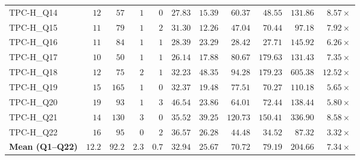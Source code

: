 \begin{table}[htbp]
\begin{tabular}{@{}lrrrrrrrrrr@{}}
TPC-H\_Q14 & $12$ & $57$ & $1$ & $0$ & $27.83$ & $15.39$ & $60.37$ & $48.55$ & $131.86$ & $8.57\times$ \\
TPC-H\_Q15 & $11$ & $79$ & $1$ & $2$ & $31.30$ & $12.26$ & $47.04$ & $70.44$ & $97.18$ & $7.92\times$ \\
TPC-H\_Q16 & $11$ & $84$ & $1$ & $1$ & $28.39$ & $23.29$ & $28.42$ & $27.71$ & $145.92$ & $6.26\times$ \\
TPC-H\_Q17 & $10$ & $50$ & $1$ & $1$ & $26.14$ & $17.88$ & $80.67$ & $179.63$ & $131.43$ & $7.35\times$ \\
TPC-H\_Q18 & $12$ & $75$ & $2$ & $1$ & $32.23$ & $48.35$ & $94.28$ & $179.23$ & $605.38$ & $12.52\times$ \\
TPC-H\_Q19 & $15$ & $165$ & $1$ & $0$ & $32.37$ & $19.48$ & $77.51$ & $70.27$ & $110.18$ & $5.65\times$ \\
TPC-H\_Q20 & $19$ & $93$ & $1$ & $3$ & $46.54$ & $23.86$ & $64.01$ & $72.44$ & $138.44$ & $5.80\times$ \\
TPC-H\_Q21 & $14$ & $130$ & $3$ & $0$ & $35.52$ & $39.25$ & $120.73$ & $150.41$ & $336.90$ & $8.58\times$ \\
TPC-H\_Q22 & $16$ & $95$ & $0$ & $2$ & $36.57$ & $26.28$ & $44.48$ & $34.52$ & $87.32$ & $3.32\times$ \\
\midrule
\textbf{Mean (Q1--Q22)} & $12.2$ & $92.2$ & $2.3$ & $0.7$ & $32.94$ & $25.67$ & $70.72$ & $79.19$ & $204.66$ & $7.34\times$ \\
\bottomrule
\end{tabular}
\end{table}